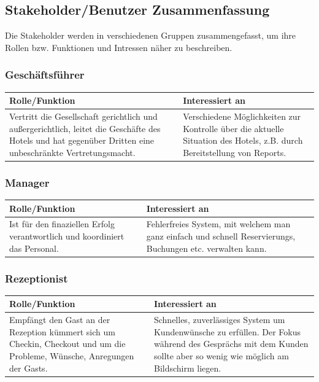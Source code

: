 \documentclass[10pt,a4paper,titlepage]{article}
\begin{document}
\subsection{Stakeholder\slash{}Benutzer Zusammenfassung}
Die Stakeholder werden in verschiedenen Gruppen zusammengefasst, um ihre Rollen bzw. Funktionen und Intressen näher zu beschreiben.
\subsubsection{Geschäftsführer}
\begin{tabular}[t]{|p{5cm}|p{5cm}|}
    \hline
    \textbf{Rolle\slash{}Funktion} & \textbf{Interessiert an} \\
    \hline
Vertritt die Gesellschaft gerichtlich und außergerichtlich, leitet die Geschäfte des Hotels und hat gegenüber Dritten eine unbeschränkte Vertretungsmacht. &
    Verschiedene Möglichkeiten zur Kontrolle über die aktuelle Situation des Hotels, z.B. durch Bereitstellung von \Glspl{Report}.\\
    \hline
\end{tabular}
\subsubsection{Manager}
\begin{tabular}[t]{|p{5cm}|p{5cm}|}
    \hline
    \textbf{Rolle\slash{}Funktion} & \textbf{Interessiert an} \\
    \hline
Ist für den finaziellen Erfolg verantwortlich und koordiniert das Personal. &
	Fehlerfreies System, mit welchem man ganz einfach und schnell \Glspl{Reservierung}, Buchungen etc. verwalten kann. \\
    \hline
\end{tabular}
\subsubsection{\Gls{Rezeptionist}}
\begin{tabular}[t]{|p{5cm}|p{5cm}|}
    \hline
    \textbf{Rolle\slash{}Funktion} & \textbf{Interessiert an} \\
    \hline
Empfängt den \Gls{Gast} an der \Gls{Rezeption} kümmert sich um \Gls{Checkin}, \Gls{Checkout} und um die Probleme, Wünsche, Anregungen der \Glspl{Gast}. &
	Schnelles, zuverlässiges System um Kundenwünsche zu erfüllen. Der Fokus während des Gesprächs mit dem \Gls{Kunde}n sollte aber so wenig wie möglich am Bildschirm liegen. \\
    \hline
\end{tabular}
\end{document}
